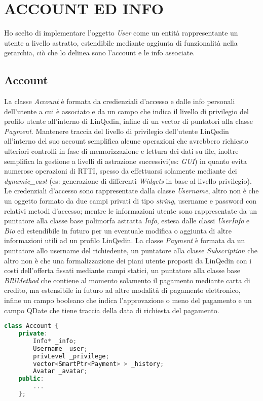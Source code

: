 \section*{ACCOUNT ED INFO}
Ho scelto di implementare l'oggetto \textit{User} come un entità rappresentante un utente a livello astratto, estendibile mediante aggiunta di funzionalità nella gerarchia,
ciò che lo delinea sono l'account e le info associate.
\subsection*{Account}
La classe \textit{Account} è formata da credienziali d'accesso e dalle info personali dell'utente a cui è associato e da un campo
che indica il livello di privilegio del profilo utente all'interno di LinQedin, infine di un vector di puntatori alla classe \textit{Payment}.
Mantenere traccia del livello di privilegio dell'utente LinQedin all'interno del suo account semplifica alcune operazioni che avrebbero richiesto
ulteriori controlli in fase di memorizzazione e lettura dei dati su file, inoltre semplifica la gestione a livelli di astrazione successivi(es: \textit{GUI})
in quanto evita numerose operazioni di RTTI, spesso da effettuarsi solamente mediante dei \textit{dynamic\_cast} (es: generazione di differenti \textit{Widgets} in base al livello privilegio).
Le credenziali d'accesso sono rappresentate dalla classe \textit{Username}, altro non è che un oggetto formato da due campi privati di tipo \textit{string},
username e password con relativi metodi d'accesso; mentre le informazioni utente sono rappresentate da un puntatore alla classe base polimorfa astratta \textit{Info},
estesa dalle classi \textit{UserInfo} e \textit{Bio} ed estendibile in futuro per un eventuale modifica o aggiunta di altre informazioni utili ad un profilo LinQedin.
La classe \textit{Payment} è formata da un puntatore allo username del richiedente, un puntatore alla classe \textit{Subscription} che altro non è che una formalizzazione
dei piani utente proposti da LinQedin con i costi dell'offerta fissati mediante campi statici, un puntatore alla classe base \textit{BIllMethod} che contiene al momento
solamento il pagamento mediante carta di credito, ma estensibile in futuro ad altre modalità di pagamento elettronico, infine un campo booleano che indica l'approvazione o meno
del pagamento e un campo QDate che tiene traccia della data di richiesta del pagamento.
\begin{lstlisting}[language=C++]
    class Account {
    private:
        Info* _info;
        Username _user;
        privLevel _privilege;
        vector<SmartPtr<Payment> > _history;
        Avatar _avatar;
    public:
        ...
    };
\end{lstlisting}
